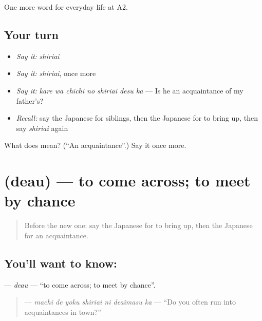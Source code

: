 \begin{grammarlens}[title={What you've built}]
One more word for everyday life at A2.
\end{grammarlens}

\subsection*{Your turn}
\begin{itemize}
\raggedright
  \item \emph{Say it:} \emph{shiriai}
  \item \emph{Say it:} \emph{shiriai}, once more
  \item \emph{Say it:} \emph{kare wa chichi no shiriai desu ka} — Is he an acquaintance of my father's?
  \item \emph{Recall:} say the Japanese for siblings, then the Japanese for to bring up, then say \emph{shiriai} again
\end{itemize}

\begin{tcolorbox}[breakable,colback=teal!4,colframe=teal!35!black,title={Before you move on}]
What does  mean? (\textquotedblleft{}An acquaintance\textquotedblright{}.) Say it once more.
\end{tcolorbox}
\section[\texorpdfstring{\ja{であう} (deau)}{であう (deau)}]{ (deau) — to come across; to meet by chance}

\label{lesson:JA-C244-deau}



\begin{quote}
Before the new one: say the Japanese for to bring up, then the Japanese for an acquaintance.
\end{quote}

\subsection*{You'll want to know: }
\textbf{} — \emph{deau} — \textquotedblleft{}to come across; to meet by chance\textquotedblright{}.

\begin{quote}
\textbf{   } — \emph{machi de yoku shiriai ni deaimasu ka} — \textquotedblleft{}Do you often run into acquaintances in town?\textquotedblright{}
\end{quote}

